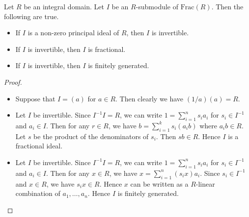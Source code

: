 \documentclass[a4paper]{article}
\begin{document}
\begin{prp}{}{} Let $R$ be an integral domain. Let $I$ be an $R$-submodule of $\text{Frac}(R)$. Then the following are true. 
\begin{itemize}
\item If $I$ is a non-zero principal ideal of $R$, then $I$ is invertible. 
\item If $I$ is invertible, then $I$ is fractional. 
\item If $I$ is invertible, then $I$ is finitely generated. 
\end{itemize} 
\begin{proof}~\\
\begin{itemize}
\item Suppose that $I=(a)$ for $a\in R$. Then clearly we have $(1/a)(a)=R$. 
\item Let $I$ be invertible. Since $I^{-1}I=R$, we can write $1=\sum_{i=1}^ns_ia_i$ for $s_i\in I^{-1}$ and $a_i\in I$. Then for any $r\in R$, we have $b=\sum_{i=1}^ks_i(a_ib)$ where $a_ib\in R$. Let $s$ be the product of the denominators of $s_i$. Then $sb\in R$. Hence $I$ is a fractional ideal. 
\item Let $I$ be invertible. Since $I^{-1}I=R$, we can write $1=\sum_{i=1}^ns_ia_i$ for $s_i\in I^{-1}$ and $a_i\in I$. Then for any $x\in R$, we have $x=\sum_{i=1}^n(s_ix)a_i$. Since $s_i\in I^{-1}$ and $x\in R$, we have $s_ix\in R$. Hence $x$ can be written as a $R$-linear combination of $a_1,\dots,a_n$. Hence $I$ is finitely generated. 
\end{itemize}
\end{proof}
\end{prp}
\end{document}
